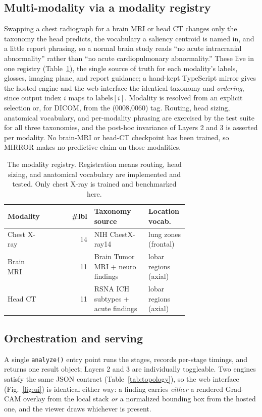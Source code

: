 \documentclass[conference]{IEEEtran}
\newcommand{\code}[1]{\texttt{\small #1}}
\begin{document}
\subsection{Multi-modality via a modality registry}
Swapping a chest radiograph for a brain MRI or head CT changes only the taxonomy
the head predicts, the vocabulary a saliency centroid is named in, and a little
report phrasing, so a normal brain study reads ``no acute intracranial
abnormality'' rather than ``no acute cardiopulmonary abnormality.'' These live in
one registry (Table~\ref{tab:modalities}), the single source of truth for each
modality's labels, glosses, imaging plane, and report guidance; a hand-kept
TypeScript mirror gives the hosted engine and the web interface the identical
taxonomy and \emph{ordering}, since output index $i$ maps to $\text{labels}[i]$.
Modality is resolved from an explicit selection or, for DICOM, from the (0008,0060)
tag. Routing, head sizing, anatomical vocabulary, and per-modality phrasing are
exercised by the test suite for all three taxonomies, and the post-hoc invariance
of Layers 2 and 3 is asserted per modality. No brain-MRI or head-CT checkpoint has
been trained, so MIRROR makes no predictive claim on those modalities.

\begin{table}[tbp]
\centering
\caption{The modality registry. Registration means routing, head sizing, and
anatomical vocabulary are implemented and tested. Only chest X-ray is trained and
benchmarked here.}
\label{tab:modalities}
\footnotesize
\begin{tabular}{@{}p{0.19\linewidth}r%
>{\raggedright\arraybackslash}p{0.30\linewidth}%
>{\raggedright\arraybackslash}p{0.22\linewidth}@{}}
\toprule
\textbf{Modality} & \textbf{\#lbl} & \textbf{Taxonomy source} & \textbf{Location vocab.} \\
\midrule
Chest X-ray & 14 & NIH ChestX-ray14 & lung zones (frontal) \\
Brain MRI   & 11 & Brain Tumor MRI + neuro findings & lobar regions (axial) \\
Head CT     & 11 & RSNA ICH subtypes + acute findings & lobar regions (axial) \\
\bottomrule
\end{tabular}
\end{table}

\subsection{Orchestration and serving}
\label{sec:serving}
A single \code{analyze()} entry point runs the stages, records per-stage timings,
and returns one result object; Layers 2 and 3 are individually toggleable. Two
engines satisfy the same JSON contract (Table~\ref{tab:topology}), so the web
interface (Fig.~\ref{fig:ui}) is identical either way: a finding carries
\emph{either} a rendered Grad-CAM overlay from the local stack \emph{or} a
normalized bounding box from the hosted one, and the viewer draws whichever is
present.
\end{document}
